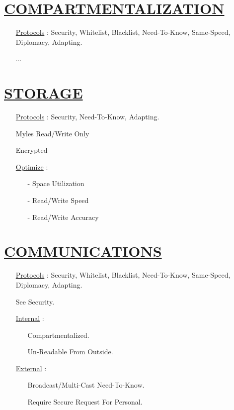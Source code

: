 \documentclass[11pt]{article}
\begin{document}
\section*{\ul{COMPARTMENTALIZATION}}
\begin{enumerate}
	\item[] \ul{Protocols} : Security, Whitelist, Blacklist, Need-To-Know,  Same-Speed, Diplomacy, Adapting.
	\item[] ...
\end{enumerate}


\section*{\ul{STORAGE}}
\begin{enumerate}
	\item[] \ul{Protocols} : Security, Need-To-Know, Adapting.
	\item[] Myles Read/Write Only
	\item[] Encrypted
	\item[] \ul{Optimize}  :
	\begin{enumerate}
		\item[-] Space Utilization
		\item[-] Read/Write Speed
		\item[-] Read/Write Accuracy
	\end{enumerate}
\end{enumerate}


\section*{\ul{COMMUNICATIONS}}
\begin{enumerate}
	\item[] \ul{Protocols} : Security, Whitelist, Blacklist, Need-To-Know, Same-Speed, Diplomacy,  Adapting.
	\item[] See Security.
	\item[] \ul{Internal} :
	\begin{enumerate}
		\item[] Compartmentalized.
		\item[] Un-Readable From Outside.
	\end{enumerate}

	\item[] \ul{External} :
	\begin{enumerate}
		\item[] Broadcast/Multi-Cast Need-To-Know.
		\item[] Require Secure Request For Personal.
	\end{enumerate}
\end{enumerate}
\end{document}
